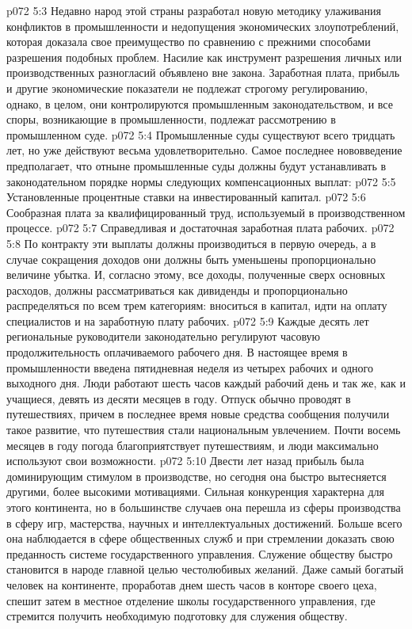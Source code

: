 \vs p072 5:3 \pc Недавно народ этой страны разработал новую методику улаживания конфликтов в промышленности и недопущения экономических злоупотреблений, которая доказала свое преимущество по сравнению с прежними способами разрешения подобных проблем. Насилие как инструмент разрешения личных или производственных разногласий объявлено вне закона. Заработная плата, прибыль и другие экономические показатели не подлежат строгому регулированию, однако, в целом, они контролируются промышленным законодательством, и все споры, возникающие в промышленности, подлежат рассмотрению в промышленном суде.
\vs p072 5:4 Промышленные суды существуют всего тридцать лет, но уже действуют весьма удовлетворительно. Самое последнее нововведение предполагает, что отныне промышленные суды должны будут устанавливать в законодательном порядке нормы следующих компенсационных выплат:
\vs p072 5:5 \bibnobreakspace Установленные процентные ставки на инвестированный капитал.
\vs p072 5:6 \bibnobreakspace Сообразная плата за квалифицированный труд, используемый в производственном процессе.
\vs p072 5:7 \bibnobreakspace Справедливая и достаточная заработная плата рабочих.
\vs p072 5:8 \pc По контракту эти выплаты должны производиться в первую очередь, а в случае сокращения доходов они должны быть уменьшены пропорционально величине убытка. И, согласно этому, все доходы, полученные сверх основных расходов, должны рассматриваться как дивиденды и пропорционально распределяться по всем трем категориям: вноситься в капитал, идти на оплату специалистов и на заработную плату рабочих.
\vs p072 5:9 \pc Каждые десять лет региональные руководители законодательно регулируют часовую продолжительность оплачиваемого рабочего дня. В настоящее время в промышленности введена пятидневная неделя из четырех рабочих и одного выходного дня. Люди работают шесть часов каждый рабочий день и так же, как и учащиеся, девять из десяти месяцев в году. Отпуск обычно проводят в путешествиях, причем в последнее время новые средства сообщения получили такое развитие, что путешествия стали национальным увлечением. Почти восемь месяцев в году погода благоприятствует путешествиям, и люди максимально используют свои возможности.
\vs p072 5:10 \pc Двести лет назад прибыль была доминирующим стимулом в производстве, но сегодня она быстро вытесняется другими, более высокими мотивациями. Сильная конкуренция характерна для этого континента, но в большинстве случаев она перешла из сферы производства в сферу игр, мастерства, научных и интеллектуальных достижений. Больше всего она наблюдается в сфере общественных служб и при стремлении доказать свою преданность системе государственного управления. Служение обществу быстро становится в народе главной целью честолюбивых желаний. Даже самый богатый человек на континенте, проработав днем шесть часов в конторе своего цеха, спешит затем в местное отделение школы государственного управления, где стремится получить необходимую подготовку для служения обществу.

